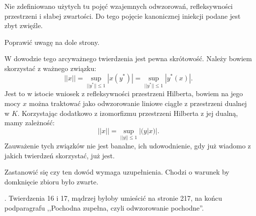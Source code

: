 \documentclass[a4paper,11pt]{article}
\begin{document}
\vspace{\spaceFour}


\start {} Nie zdefiniowano użytych tu pojęć wzajemnych
odwzorowań, refleksywności przestrzeni i słabej zwartości. Do tego
pojęcie kanonicznej iniekcji podane jest zbyt zwięźle.

\vspace{\spaceFour}


\start {} Poprawić uwagę na dole strony.

\vspace{\spaceFour}


\start {} W dowodzie tego arcyważnego twierdzenia jest pewna
skrótowość. Należy bowiem skorzystać z ważnego związku:
\begin{equation*}
  || x || = \sup_{ || y^{ * } || \leq 1 } | x( y^{ * } ) |
  = \sup_{ || y^{ * } || \leq1 } | y^{ * }( x ) | \textrm{.}
\end{equation*}
Jest to w istocie wniosek z refleksywności przestrzeni Hilberta,
bowiem na jego mocy $x$ można traktować jako odwzorowanie liniowe
ciągłe z przestrzeni dualnej w $K$. Korzystając dodatkowo z
izomorfizmu przestrzeni Hilberta z jej dualną, mamy \linebreak
zależność:
\begin{equation*}
  || x || = \sup_{ || y || \leq 1 } | ( y | x ) | \textrm{.}
\end{equation*}
Zauważenie tych związków nie jest banalne, ich udowodnienie, gdy już
wiadomo z jakich twierdzeń skorzystać, już jest.

\vspace{\spaceFour}


\start {} Zastanowić się czy ten dowód wymaga uzupełnienia.
Chodzi o warunek by domknięcie zbioru było zwarte.

\vspace{\spaceFour}


\start {}. Twierdzenia 16 i 17, mądrzej byłoby umieścić na
stronie 217, na końcu podparagrafu ,,Pochodna zupełna, czyli
odwzorowanie pochodne''.

\vspace{\spaceFour}
\end{document}
